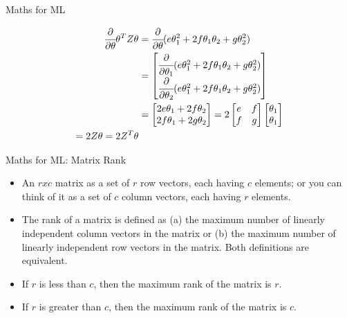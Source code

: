 \documentclass{beamer}
\begin{document}
\begin{frame}{Maths for ML}
    
    \begin{center}
    
        \begin{align*}
             \cfrac{\partial}{\partial \theta} \theta^{T} Z \theta &= \cfrac{\partial}{\partial \theta} (e\theta_{1}^{2} + 2f\theta_{1}\theta_{2}+g\theta_{2}^{2} )\\
            &= \begin{bmatrix}\cfrac{\partial}{\partial \theta_{1}} (e\theta_{1}^{2} + 2f\theta_{1}\theta_{2}+g\theta_{2}^{2} )\\
            \cfrac{\partial}{\partial \theta_{2}} (e\theta_{1}^{2} + 2f\theta_{1}\theta_{2}+g\theta_{2}^{2} )
            \end{bmatrix}\\
            &=\begin{bmatrix}2e\theta_{1}+2f\theta_{2}\\
            2f\theta_{1}+2g\theta_{2}\end{bmatrix}
            =  2\begin{bmatrix}e&f\\f&g\end{bmatrix}\begin{bmatrix}\theta_{1}\\ \theta_{1} \end{bmatrix} \\
            =2Z\theta = 2Z^{T}\theta
    \end{align*}
    \end{center}
\end{frame}

\begin{frame}{Maths for ML: Matrix Rank\footnotemark}
\begin{itemize}[<+-> ]
	\item An $r x c$ matrix as a set of $r$ row vectors, each having $c$ elements; or you can think of it as a set of $c$ column vectors, each having $r$ elements.
	\item The rank of a matrix is defined as (a) the maximum number of linearly independent column vectors in the matrix or (b) the maximum number of linearly independent row vectors in the matrix. Both definitions are equivalent.
	\item If $r$ is less than $c$, then the maximum rank of the matrix is $r$.
	\item If $r$ is greater than $c$, then the maximum rank of the matrix is $c$.
	
\end{itemize}
\end{frame}
\end{document}
